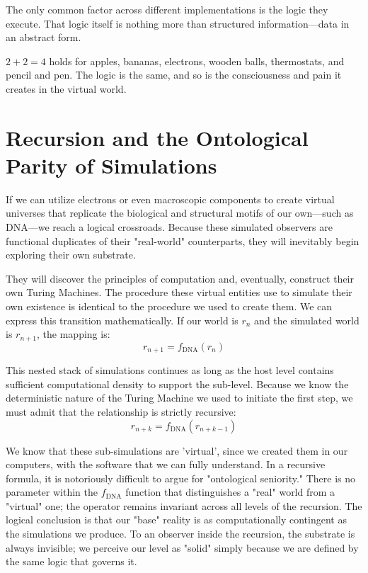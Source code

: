 The only common factor across different implementations is the logic they execute.
That logic itself is nothing more than structured information—data in an abstract form.

$2+2=4$ holds for apples, bananas, electrons, wooden balls, thermostats, and pencil and pen. The logic is the same, and so is the consciousness and pain it creates in the virtual world.


\section{Recursion and the Ontological Parity of Simulations}

If we can utilize electrons or even macroscopic components to create virtual universes that replicate the biological and structural motifs of our own—such as DNA—we reach a logical crossroads. Because these simulated observers are functional duplicates of their "real-world" counterparts, they will inevitably begin exploring their own substrate. 

They will discover the principles of computation and, eventually, construct their own Turing Machines. The procedure these virtual entities use to simulate their own existence is identical to the procedure we used to create them. We can express this transition mathematically. If our world is $r_n$ and the simulated world is $r_{n+1}$, the mapping is:
\[ r_{n+1} = f_{\text{DNA}}(r_n) \]

This nested stack of simulations continues as long as the host level contains sufficient computational density to support the sub-level. Because we know the deterministic nature of the Turing Machine we used to initiate the first step, we must admit that the relationship is strictly recursive:
\[ r_{n+k} = f_{\text{DNA}}(r_{n+k-1}) \]

We know that these sub-simulations are 'virtual', since we created them in our computers, with the software that we can fully understand.
In a recursive formula, it is notoriously difficult to argue for "ontological seniority."
There is no parameter within the $f_{\text{DNA}}$ function that distinguishes a "real" world from a "virtual" one; the operator remains invariant across all levels of the recursion.
The logical conclusion is that our "base" reality is as computationally contingent as the simulations we produce.
To an observer inside the recursion, the substrate is always invisible; we perceive our level as "solid" simply because we are defined by the same logic that governs it.

